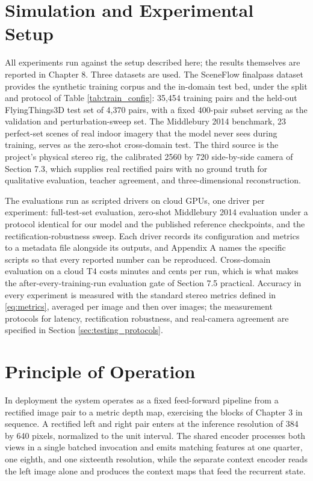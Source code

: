 \FloatBarrier
\section{Simulation and Experimental Setup}
All experiments run against the setup described here; the results
themselves are reported in Chapter 8. Three datasets are used. The
SceneFlow finalpass dataset provides the synthetic training corpus and
the in-domain test bed, under the split and protocol of Table
\ref{tab:train_config}: 35,454 training pairs and the held-out
FlyingThings3D test set of 4,370 pairs, with a fixed 400-pair subset
serving as the validation and perturbation-sweep set. The Middlebury 2014
benchmark, 23 perfect-set scenes of real indoor imagery that the model
never sees during training, serves as the zero-shot cross-domain test.
The third source is the project's physical stereo rig, the calibrated
2560 by 720 side-by-side camera of Section 7.3, which supplies real
rectified pairs with no ground truth for qualitative evaluation, teacher
agreement, and three-dimensional reconstruction.

The evaluations run as scripted drivers on cloud GPUs, one driver per
experiment: full-test-set evaluation, zero-shot Middlebury 2014
evaluation under a protocol identical for our model and the published
reference checkpoints, and the rectification-robustness sweep. Each
driver records its configuration and metrics to a metadata file alongside
its outputs, and Appendix A names the specific scripts so that every
reported number can be reproduced. Cross-domain evaluation on a cloud T4
costs minutes and cents per run, which is what makes the
after-every-training-run evaluation gate of Section 7.5 practical.
Accuracy in every experiment is measured with the standard stereo metrics
defined in \eqref{eq:metrics}, averaged per image and then over images;
the measurement protocols for latency, rectification robustness, and
real-camera agreement are specified in Section
\ref{sec:testing_protocols}.

\FloatBarrier
\section{Principle of Operation}
In deployment the system operates as a fixed feed-forward pipeline from a
rectified image pair to a metric depth map, exercising the blocks of
Chapter 3 in sequence. A rectified left and right pair enters at the
inference resolution of 384 by 640 pixels, normalized to the unit
interval. The shared encoder processes both views in a single batched
invocation and emits matching features at one quarter, one eighth, and
one sixteenth resolution, while the separate context encoder reads the
left image alone and produces the context maps that feed the recurrent
state.

